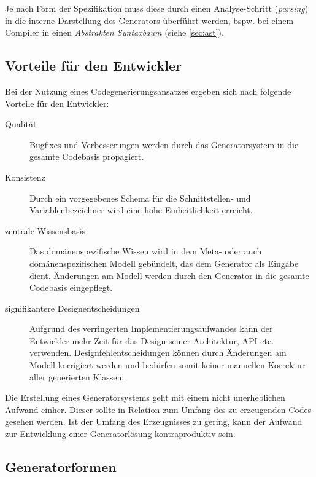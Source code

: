 Je nach Form der Spezifikation muss diese durch einen Analyse-Schritt (\emph{parsing}) in die interne Darstellung des Generators überführt werden, bspw. bei einem Compiler in einen \emph{Abstrakten Syntaxbaum} (siehe \cref{sec:ast}).

\subsection{Vorteile für den Entwickler}
\label{sec:advantages_for_the_developer}

Bei der Nutzung eines Codegenerierungsansatzes ergeben sich nach \cite[][S. 15]{herrington2003code} folgende Vorteile für den Entwickler:

\begin{description}
    \item[Qualität]
        Bugfixes und Verbesserungen werden durch das Generatorsystem in die gesamte Codebasis propagiert.
    \item[Konsistenz]
        Durch ein vorgegebenes Schema für die Schnittstellen- und Variablenbezeichner wird eine hohe Einheitlichkeit erreicht.
    \item[zentrale Wissensbasis]
        Das domänenspezifische Wissen wird in dem Meta- oder auch domänenspezifischen Modell gebündelt, das dem Generator als Eingabe dient. Änderungen am Modell werden durch den Generator in die gesamte Codebasis eingepflegt.
    \item[signifikantere Designentscheidungen]
        Aufgrund des verringerten Implementierungsaufwandes kann der Entwickler mehr Zeit für das Design seiner Architektur, \gls{API} etc. verwenden. Designfehlentscheidungen können durch Änderungen am Modell korrigiert werden und bedürfen somit keiner manuellen Korrektur aller generierten Klassen.
\end{description}

Die Erstellung eines Generatorsystems geht mit einem nicht unerheblichen Aufwand einher. Dieser sollte in Relation zum Umfang des zu erzeugenden Codes gesehen werden.
Ist der Umfang des Erzeugnisses zu gering, kann der Aufwand zur Entwicklung einer Generatorlösung kontraproduktiv sein.

\subsection{Generatorformen}
\label{sec:generator_models}

